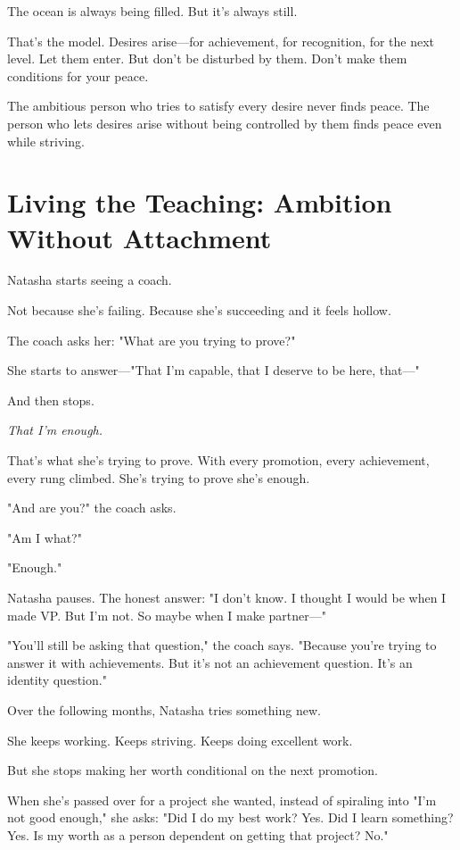 \documentclass[11pt,twoside]{book}
\begin{document}
The ocean is always being filled. But it's always still.

That's the model. Desires arise—for achievement, for recognition, for the next level. Let them enter. But don't be disturbed by them. Don't make them conditions for your peace.

The ambitious person who tries to satisfy every desire never finds peace. The person who lets desires arise without being controlled by them finds peace even while striving.

\section*{Living the Teaching: Ambition Without Attachment}

Natasha starts seeing a coach.

Not because she's failing. Because she's succeeding and it feels hollow.

The coach asks her: "What are you trying to prove?"

She starts to answer—"That I'm capable, that I deserve to be here, that—"

And then stops.

\emph{That I'm enough.}

That's what she's trying to prove. With every promotion, every achievement, every rung climbed. She's trying to prove she's enough.

"And are you?" the coach asks.

"Am I what?"

"Enough."

Natasha pauses. The honest answer: "I don't know. I thought I would be when I made VP. But I'm not. So maybe when I make partner—"

"You'll still be asking that question," the coach says. "Because you're trying to answer it with achievements. But it's not an achievement question. It's an identity question."

Over the following months, Natasha tries something new.

She keeps working. Keeps striving. Keeps doing excellent work.

But she stops making her worth conditional on the next promotion.

When she's passed over for a project she wanted, instead of spiraling into "I'm not good enough," she asks: "Did I do my best work? Yes. Did I learn something? Yes. Is my worth as a person dependent on getting that project? No."
\end{document}
